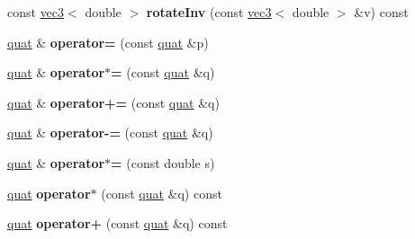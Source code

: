 \begin{DoxyCompactItemize}
\item 
\hypertarget{classmath_1_1quat_a42f50c4378af552d28e761f8c3e884a9}{
const \hyperlink{classmath_1_1vec3}{vec3}$<$ double $>$ {\bfseries rotateInv} (const \hyperlink{classmath_1_1vec3}{vec3}$<$ double $>$ \&v) const }
\label{classmath_1_1quat_a42f50c4378af552d28e761f8c3e884a9}

\item 
\hypertarget{classmath_1_1quat_a1ed0d2c147ecb5ac5c883de8a5b8dcda}{
\hyperlink{classmath_1_1quat}{quat} \& {\bfseries operator=} (const \hyperlink{classmath_1_1quat}{quat} \&p)}
\label{classmath_1_1quat_a1ed0d2c147ecb5ac5c883de8a5b8dcda}

\item 
\hypertarget{classmath_1_1quat_a5a91d5ac36d622a38019d251fa36052e}{
\hyperlink{classmath_1_1quat}{quat} \& {\bfseries operator$\ast$=} (const \hyperlink{classmath_1_1quat}{quat} \&q)}
\label{classmath_1_1quat_a5a91d5ac36d622a38019d251fa36052e}

\item 
\hypertarget{classmath_1_1quat_a726b3d1a6b752825275640b9be95e146}{
\hyperlink{classmath_1_1quat}{quat} \& {\bfseries operator+=} (const \hyperlink{classmath_1_1quat}{quat} \&q)}
\label{classmath_1_1quat_a726b3d1a6b752825275640b9be95e146}

\item 
\hypertarget{classmath_1_1quat_a00756143601dc92e5762e3321a3ef3b6}{
\hyperlink{classmath_1_1quat}{quat} \& {\bfseries operator-\/=} (const \hyperlink{classmath_1_1quat}{quat} \&q)}
\label{classmath_1_1quat_a00756143601dc92e5762e3321a3ef3b6}

\item 
\hypertarget{classmath_1_1quat_a90295c24018c6b84b88a682b5384db3e}{
\hyperlink{classmath_1_1quat}{quat} \& {\bfseries operator$\ast$=} (const double s)}
\label{classmath_1_1quat_a90295c24018c6b84b88a682b5384db3e}

\item 
\hypertarget{classmath_1_1quat_a55ebbe795c43772d6b7d7958910b0fa4}{
\hyperlink{classmath_1_1quat}{quat} {\bfseries operator$\ast$} (const \hyperlink{classmath_1_1quat}{quat} \&q) const }
\label{classmath_1_1quat_a55ebbe795c43772d6b7d7958910b0fa4}

\item 
\hypertarget{classmath_1_1quat_abe6847bb92a612e5e0182477fd7a4791}{
\hyperlink{classmath_1_1quat}{quat} {\bfseries operator+} (const \hyperlink{classmath_1_1quat}{quat} \&q) const }
\label{classmath_1_1quat_abe6847bb92a612e5e0182477fd7a4791}


\end{DoxyCompactItemize}
